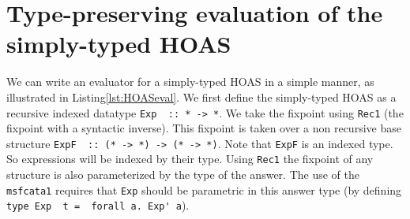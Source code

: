 \section{Type-preserving evaluation of the simply-typed HOAS}
\label{sec:HOASeval}
We can write an evaluator for a simply-typed HOAS in a simple manner,
as illustrated in Listing\;\ref{lst:HOASeval}.
We first define the simply-typed HOAS as a recursive indexed datatype
\lstinline{Exp  :: * -> *}. We take the fixpoint using \lstinline{Rec1}
(the fixpoint with a syntactic inverse). This fixpoint is taken over
a non recursive base structure \lstinline{ExpF  :: (* -> *) -> (* -> *)}.
Note that \lstinline{ExpF} is an indexed type. So expressions will be indexed
by their type. Using \lstinline{Rec1} the fixpoint of any structure is also
parameterized by the type of the answer. The use of the \lstinline{msfcata1}
requires that \lstinline{Exp} should be parametric in this answer type
(by defining \lstinline{type Exp  t =  forall a. Exp' a}). 

\begin{figure}

\vspace*{-3ex}
\end{figure}

